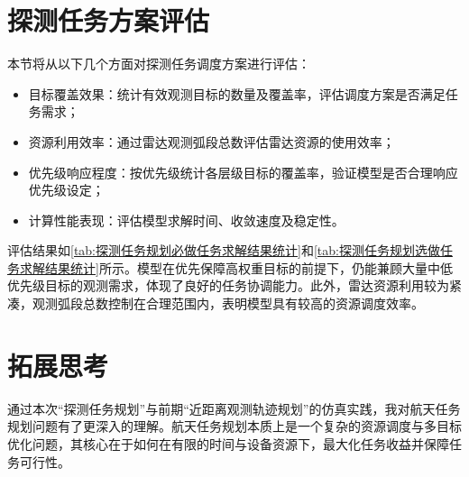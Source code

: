 \documentclass[openany,12pt,UTF8]{ctexart}
\begin{document}
\section{探测任务方案评估}
本节将从以下几个方面对探测任务调度方案进行评估：
\begin{itemize}
    \item {目标覆盖效果}：统计有效观测目标的数量及覆盖率，评估调度方案是否满足任务需求；
    \item {资源利用效率}：通过雷达观测弧段总数评估雷达资源的使用效率；
    \item {优先级响应程度}：按优先级统计各层级目标的覆盖率，验证模型是否合理响应优先级设定；
    \item {计算性能表现}：评估模型求解时间、收敛速度及稳定性。
\end{itemize}

评估结果如\autoref{tab:探测任务规划必做任务求解结果统计}和\autoref{tab:探测任务规划选做任务求解结果统计}所示。模型在优先保障高权重目标的前提下，仍能兼顾大量中低优先级目标的观测需求，体现了良好的任务协调能力。此外，雷达资源利用较为紧凑，观测弧段总数控制在合理范围内，表明模型具有较高的资源调度效率。

\section{拓展思考}
通过本次“探测任务规划”与前期“近距离观测轨迹规划”的仿真实践，我对航天任务规划问题有了更深入的理解。航天任务规划本质上是一个复杂的资源调度与多目标优化问题，其核心在于如何在有限的时间与设备资源下，最大化任务收益并保障任务可行性。
\end{document}
